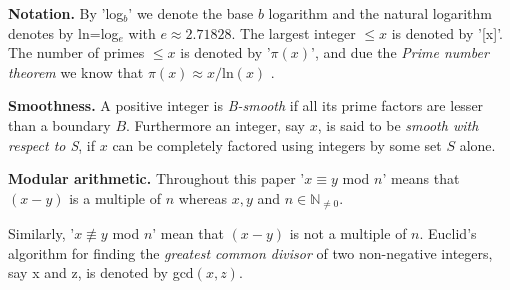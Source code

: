 {\bf Notation.} By 'log$_b$' we denote the base $b$ logarithm and the natural logarithm denotes by ln=log$_e$ with $e \approx 2.71828$. 
The largest integer $\leq x$ is denoted by '[x]'.  The number of primes $\leq x$ is denoted by '$\pi(x)$', and due the \emph{Prime number theorem}\cite{Hardy2008}
we know that $\pi(x) \approx x / $ln$(x)$ .

{\bf Smoothness.} A positive integer is \emph{B-smooth} if all its prime factors are lesser than a boundary $B$.
Furthermore an integer, say $x$, is said to be \emph{smooth with respect to S}, if $x$ can be completely factored using
integers by some set $S$ alone.


{\bf Modular arithmetic.} Throughout this paper '$x \equiv y$ mod $n$' means that $(x-y)$ is a multiple of $n$ whereas $x,y$ and $n \in \mathbb{N}_{\ne 0}$.

Similarly, '$x \not\equiv y$ mod $n$' mean that $(x-y)$ is not a multiple of $n$. 
Euclid's algorithm for finding the \emph{greatest common divisor} of two non-negative integers, say x and z, is denoted by gcd$(x,z)$.
